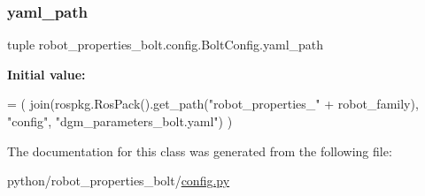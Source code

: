 \subsubsection{\texorpdfstring{yaml\+\_\+path}{yaml\_path}}
{\footnotesize\ttfamily tuple robot\+\_\+properties\+\_\+bolt.\+config.\+Bolt\+Config.\+yaml\+\_\+path\hspace{0.3cm}{\ttfamily [static]}}

{\bfseries Initial value\+:}
\begin{DoxyCode}
=  (
        join(rospkg.RosPack().get\_path(\textcolor{stringliteral}{"robot\_properties\_"} + robot\_family),
             \textcolor{stringliteral}{"config"},
             \textcolor{stringliteral}{"dgm\_parameters\_bolt.yaml"})
    )
\end{DoxyCode}


The documentation for this class was generated from the following file\+:\begin{DoxyCompactItemize}
\item 
python/robot\+\_\+properties\+\_\+bolt/\hyperlink{config_8py}{config.\+py}\end{DoxyCompactItemize}
